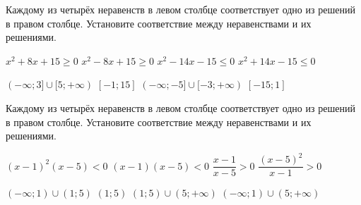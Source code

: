 \begin{class}[number=6]
	\begin{listofex}
		\item Каждому из четырёх неравенств в левом столбце соответствует одно из решений в правом столбце. Установите соответствие между неравенствами и их решениями. \\
		\begin{minipage}[t]{0.45\linewidth}
			\begin{tasks}
				\task \( x^2+8x+15 \ge 0 \)
				\task \( x^2 - 8x + 15 \ge 0 \)
				\task \( x^2 - 14x - 15 \le 0 \)
				\task \( x^2 + 14x - 15 \le 0 \)
			\end{tasks}
		\end{minipage}
		\hspace{0.02\linewidth}
		\begin{minipage}[t]{0.45\linewidth}
			\begin{tasks}
				\task \( (- \infty; 3 ] \cup [5; + \infty ) \)
				\task \([-1; 15]  \)
				\task \(  (- \infty; -5 ] \cup [-3; + \infty ) \)
				\task \( [-15; 1] \)
			\end{tasks}
		\end{minipage}
		
		\item Каждому из четырёх неравенств в левом столбце соответствует одно из решений в правом столбце. Установите соответствие между неравенствами и их решениями. \\
	\begin{minipage}[t]{0.45\linewidth}
		\begin{tasks}
			\task \( (x-1)^2(x-5) < 0 \)
			\task \( (x-1)(x-5) < 0 \)
			\task \( \dfrac{ x-1 }{ x-5 }>0 \)
			\task \( \dfrac{ (x-5)^2 }{ x-1 }>0 \)
		\end{tasks}
	\end{minipage}
	\hspace{0.02\linewidth}
	\begin{minipage}[t]{0.45\linewidth}
		\begin{tasks}
			\task \( (- \infty;1) \cup (1; 5) \)
			\task \( (1;5) \)
			\task \( (1;5) \cup (5; + \infty) \)
			\task \( (-\infty;1) \cup (5; +\infty) \)
		\end{tasks}
	\end{minipage}
		

\end{listofex}
\end{class}
